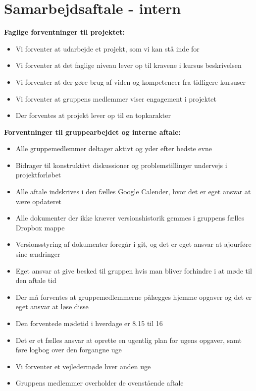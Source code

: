 \section{Samarbejdsaftale - intern}

\textbf{Faglige forventninger til projektet:}
\begin{itemize}
	\item Vi forventer at udarbejde et projekt, som vi kan stå inde for
	\item Vi forventer at det faglige niveau lever op til kravene i kursus beskrivelsen
	\item Vi forventer at der gøre brug af viden og kompetencer fra tidligere kursuser
	\item Vi forventer at gruppens medlemmer viser engagement i projektet
	\item Der forventes at projekt lever op til en topkarakter
\end{itemize}

\textbf{Forventninger til gruppearbejdet og interne aftale:}
\begin{itemize}
	\item Alle gruppemedlemmer deltager aktivt og yder efter bedste evne
	\item Bidrager til konstruktivt diskussioner og problemstillinger undervejs i projektforløbet
	\item Alle aftale indskrives i den fælles Google Calender, hvor det er eget ansvar at være opdateret
	\item Alle dokumenter der ikke kræver versionshistorik gemmes i gruppens fælles Dropbox mappe
	\item Versionsstyring af dokumenter foregår i git, og det er eget ansvar at ajourføre sine ændringer
	\item Eget ansvar at give besked til gruppen hvis man bliver forhindre i at møde til den aftale tid
	\item Der må forventes at gruppemedlemmerne pålægges hjemme opgaver og det er eget ansvar at løse disse
	\item Den forventede mødetid i hverdage er 8.15 til 16
	\item Det er et fælles ansvar at oprette en ugentlig plan for ugens opgaver, samt føre logbog over den forgangne uge	
	\item Vi forventer et vejledermøde hver anden uge
	\item Gruppens medlemmer overholder de ovenstående aftale
\end{itemize}

